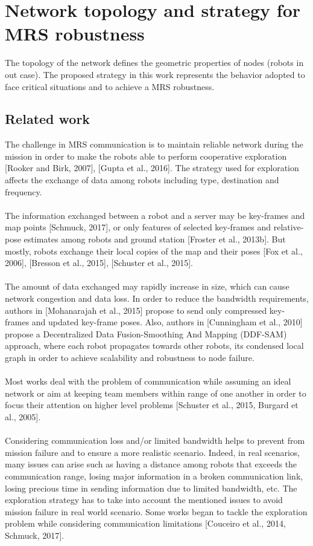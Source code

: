 \documentclass[11pt,openany]{book}
\begin{document}
\section{Network topology and strategy for MRS robustness}
The topology of the network defines the geometric properties of nodes (robots in out case). The proposed strategy in this work represents the behavior adopted to face critical situations and to achieve a MRS robustness.
\subsection{Related work}
The challenge in MRS communication is to maintain reliable network during the mission in order to make the robots able to perform cooperative exploration [Rooker and Birk, 2007], [Gupta et al., 2016]. The strategy used for exploration affects the exchange of data among robots including type, destination and frequency.\\\\
The information exchanged between a robot and a server may be key-frames and map points [Schmuck, 2017], or only features of selected key-frames and relative-pose estimates among robots and ground station [Froster et al., 2013b]. But mostly, robots exchange their local copies of the map and their poses [Fox et al., 2006], [Bresson et al., 2015], [Schuster et al., 2015].\\\\
The amount of data exchanged may rapidly increase in size, which can cause network congestion and data loss. In order to reduce the bandwidth requirements, authors in [Mohanarajah et al., 2015] propose to send only compressed key-frames and updated key-frame poses. Also, authors in [Cunningham et al., 2010] propose a Decentralized Data Fusion-Smoothing And Mapping (DDF-SAM) approach, where each robot propagates towards other robots, its condensed local graph in order to achieve scalability and robustness to node failure.\\\\
Most works deal with the problem of communication while assuming an ideal network or aim at keeping team members within range of one another in order to focus their attention on higher level problems [Schuster et al., 2015, Burgard et al., 2005].\\\\
Considering communication loss and/or limited bandwidth helps to prevent from mission failure and to ensure a more realistic scenario. Indeed, in real scenarios, many issues can arise such as having a distance among robots that exceeds the communication range, losing major information in a broken communication link, losing precious time in sending information due to limited bandwidth, etc. The exploration strategy has to take into account the mentioned issues to avoid mission failure in real world scenario. Some works began to tackle the exploration problem while considering communication limitations [Couceiro et al., 2014, Schmuck, 2017].\\\\
\end{document}

